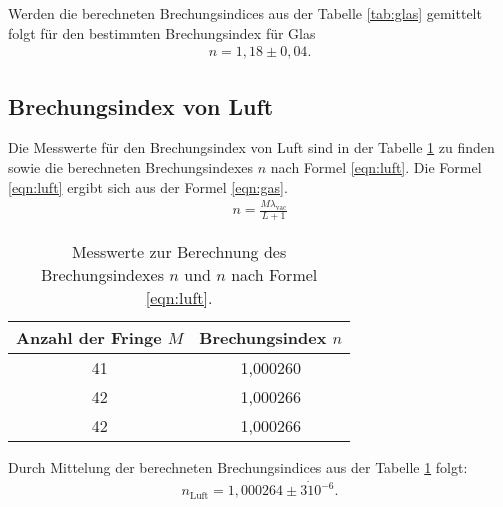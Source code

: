 Werden die berechneten Brechungsindices aus der Tabelle \ref{tab:glas} gemittelt folgt für den
bestimmten Brechungsindex für Glas
\begin{align*}
  n=1,18\pm0,04.
\end{align*}


\subsection{Brechungsindex von Luft}
Die Messwerte für den Brechungsindex von Luft sind in der Tabelle \ref{tab:luft}
zu finden sowie die berechneten Brechungsindexes $n$ nach Formel \eqref{eqn:luft}.
Die Formel \eqref{eqn:luft} ergibt sich aus der Formel \eqref{eqn:gas}.
\begin{align}%
    n=\frac{M\lambda_\mathrm{vac}}{L+1}
\end{align}

\begin{table}
\centering
\caption{Messwerte zur Berechnung des Brechungsindexes $n$ und $n$ nach Formel \eqref{eqn:luft}.}
\label{tab:luft}
\begin{tabular}{c c}
\toprule
  Anzahl der Fringe $M$ & Brechungsindex $n$ \\
\midrule
41 &  1,000260\\
42 &  1,000266\\
42 &  1,000266\\
\bottomrule
\end{tabular}
\end{table}
Durch Mittelung der berechneten Brechungsindices aus der Tabelle \ref{tab:luft}
folgt:
\begin{align*}
  n_\mathrm{Luft}=1,000264\pm 3\dot10^{-6}.
\end{align*}
